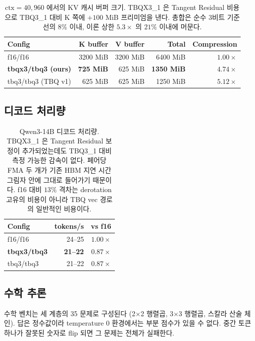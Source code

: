 \documentclass[10pt,twocolumn]{article}
\begin{document}
\begin{table}[t]
\centering
\small
\begin{tabular}{@{}lrrrr@{}}
\toprule
\textbf{Config} & \textbf{K buffer} & \textbf{V buffer} & \textbf{Total} & \textbf{Compression} \\
\midrule
f16/f16                     & 3200 MiB & 3200 MiB & 6400 MiB & $1.00\times$ \\
\textbf{tbqx3/tbq3 (ours)}  & \textbf{725 MiB} & 625 MiB & \textbf{1350 MiB} & \textbf{$4.74\times$} \\
tbq3/tbq3 (TBQ v1)          & 625 MiB & 625 MiB & 1250 MiB & $5.12\times$ \\
\bottomrule
\end{tabular}
\caption{$\text{ctx}=40{,}960$ 에서의 KV 캐시 버퍼 크기. TBQX3\_1 은 Tangent Residual 비용으로 TBQ3\_1 대비 K 쪽에 $+100$ MiB 프리미엄을 낸다. 총합은 순수 3비트 기준선의 $8\%$ 이내, 이론 상한 $5.3\times$ 의 $21\%$ 이내에 머문다.}
\label{tab:memory}
\end{table}

\subsection{디코드 처리량}

\begin{table}[t]
\centering
\small
\begin{tabular}{@{}lrr@{}}
\toprule
\textbf{Config} & \textbf{tokens/s} & \textbf{vs f16} \\
\midrule
f16/f16               & 24--25 & $1.00\times$ \\
\textbf{tbqx3/tbq3}   & \textbf{21--22} & \textbf{$0.87\times$} \\
tbq3/tbq3             & 21--22 & $0.87\times$ \\
\bottomrule
\end{tabular}
\caption{Qwen3-14B 디코드 처리량. TBQX3\_1 은 Tangent Residual 보정이 추가되었는데도 TBQ3\_1 대비 측정 가능한 감속이 없다. 페어당 FMA 두 개가 기존 HBM 지연 시간 그림자 안에 그대로 들어가기 때문이다. f16 대비 $13\%$ 격차는 derotation 고유의 비용이 아니라 TBQ vec 경로의 일반적인 비용이다.}
\label{tab:throughput}
\end{table}

\subsection{수학 추론}

수학 벤치는 세 계층의 35 문제로 구성된다 (2$\times$2 행렬곱, 3$\times$3 행렬곱, 스칼라 산술 체인). 답은 정수값이라 temperature $0$ 환경에서는 부분 점수가 있을 수 없다. 중간 토큰 하나가 잘못된 숫자로 flip 되면 그 문제는 전체가 실패한다.
\end{document}
